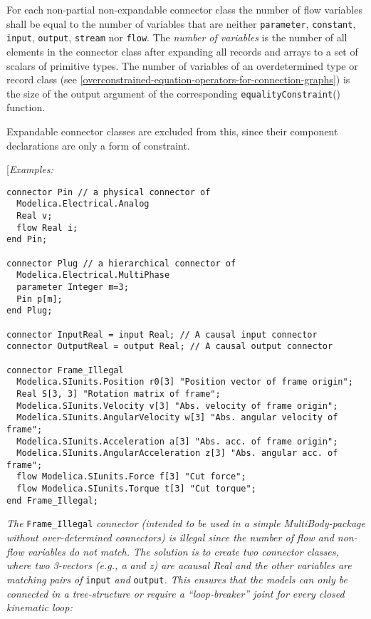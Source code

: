 For each non-partial non-expandable connector class the number of flow variables shall
be equal to the number of variables that are neither \lstinline!parameter!,
\lstinline!constant!, \lstinline!input!, \lstinline!output!, \lstinline!stream!
nor \lstinline!flow!. The \emph{number of variables} is
the number of all elements in the connector class after expanding all
records and arrays to a set of scalars of primitive types. The number of
variables of an overdetermined type or record class (see \autoref{overconstrained-equation-operators-for-connection-graphs})
is the size of the output argument of the corresponding
\lstinline!equalityConstraint!() function.
\begin{nonnormative}
Expandable connector classes are excluded from this, since their component declarations are only a form of constraint.
\end{nonnormative}

{[}\emph{Examples:}

\begin{lstlisting}[language=modelica]
connector Pin // a physical connector of
  Modelica.Electrical.Analog
  Real v;
  flow Real i;
end Pin;

connector Plug // a hierarchical connector of
  Modelica.Electrical.MultiPhase
  parameter Integer m=3;
  Pin p[m];
end Plug;

connector InputReal = input Real; // A causal input connector
connector OutputReal = output Real; // A causal output connector

connector Frame_Illegal
  Modelica.SIunits.Position r0[3] "Position vector of frame origin";
  Real S[3, 3] "Rotation matrix of frame";
  Modelica.SIunits.Velocity v[3] "Abs. velocity of frame origin";
  Modelica.SIunits.AngularVelocity w[3] "Abs. angular velocity of frame";
  Modelica.SIunits.Acceleration a[3] "Abs. acc. of frame origin";
  Modelica.SIunits.AngularAcceleration z[3] "Abs. angular acc. of frame";
  flow Modelica.SIunits.Force f[3] "Cut force";
  flow Modelica.SIunits.Torque t[3] "Cut torque";
end Frame_Illegal;
\end{lstlisting}

\emph{The} \lstinline!Frame_Illegal! \emph{connector (intended to be used in a
simple MultiBody-package without over-determined connectors) is illegal
since the number of flow and non-flow variables do not match. The
solution is to create two connector classes, where two 3-vectors (e.g.,
a and z) are acausal Real and the other variables are matching pairs of}
\lstinline!input! \emph{and} \lstinline!output!\emph{. This ensures that the models can only be
connected in a tree-structure or require a ``loop-breaker'' joint for
every closed kinematic loop:}

